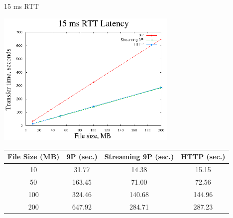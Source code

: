 \documentclass[11pt,compress]{beamer}
\begin{document}
\begin{frame}{15 ms RTT}
\begin{center}
	\includegraphics[width=0.65\textwidth]{results/15ms-stream.png}
	\scriptsize{
	\begin{table}
		\begin{center}
			\begin{tabular}{ | c | c | c | c | }
			\hline
			\bf{File Size (MB)} & \bf{9P (sec.)} & \bf{Streaming 9P (sec.)} & \bf{HTTP (sec.)} \\ \hline
			10 & 31.77 & 14.38 & 15.15 \\ \hline
			50 & 163.45 & 71.00 & 72.56 \\ \hline
			100 & 324.46 & 140.68 & 144.96 \\ \hline
			200 & 647.92 & 284.71 & 287.23 \\ \hline
			\end{tabular}
		\end{center}
	\end{table}
	}
\end{center}
\end{frame}
\end{document}
